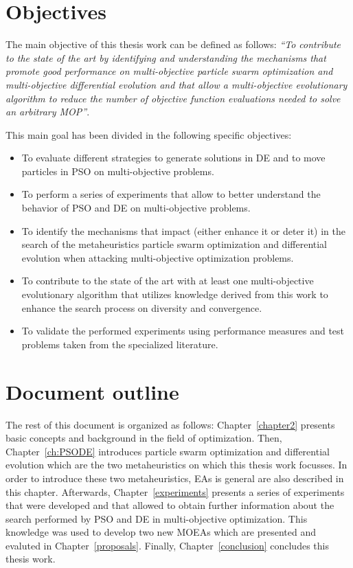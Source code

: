 \section{Objectives}

The main objective of this thesis work can be defined as follows: \emph{``To contribute to the state of the art by identifying and understanding the mechanisms that promote good performance on multi-objective particle swarm optimization and multi-objective differential evolution and that allow a multi-objective evolutionary algorithm to reduce the number of objective function evaluations needed to solve an arbitrary MOP''}. 

This main goal has been divided in the following specific objectives: 
\begin{itemize}\setlength{\itemsep}{-1mm}
	\item To evaluate different strategies to generate solutions in DE and to move particles in PSO on multi-objective problems.
	\item To perform a series of experiments that allow to better understand the behavior of PSO and DE on multi-objective problems.
	\item To identify the mechanisms that impact (either enhance it or deter it) in the search of the metaheuristics particle swarm optimization and differential evolution when attacking multi-objective optimization problems. 
	\item To contribute to the state of the art with at least one multi-objective evolutionary algorithm that utilizes knowledge derived from this work to enhance the search process on diversity and convergence. 
	\item To validate the performed experiments using performance measures and test problems taken from the specialized literature.
\end{itemize}


\section{Document outline}

The rest of this document is organized as follows: Chapter~\ref{chapter2} presents basic concepts and background in the field of optimization. Then, Chapter~\ref{ch:PSODE} introduces particle swarm optimization and differential evolution which are the two metaheuristics on which this thesis work focusses. In order to introduce these two metaheuristics, EAs is general are also described in this chapter. Afterwards, Chapter~\ref{experiments} presents a series of experiments that were developed and that allowed to obtain further information about the search performed by PSO and DE in multi-objective optimization. This knowledge was used to develop two new MOEAs which are presented and evaluted in Chapter~\ref{proposals}. Finally, Chapter~\ref{conclusion} concludes this thesis work. 



